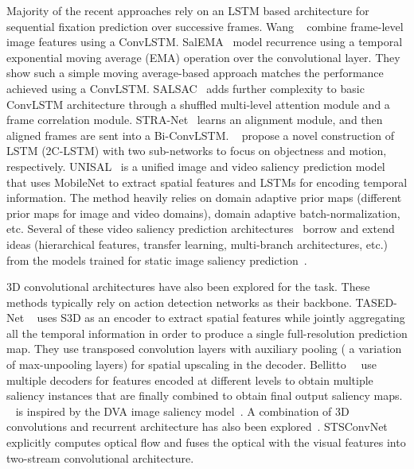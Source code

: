 \documentclass[letterpaper, 10 pt, conference]{ieeeconf}  \usepackage{times}
\begin{document}
Majority of the recent approaches rely on an LSTM based architecture for sequential fixation prediction over successive frames. Wang \etal~\cite{wang2018revisiting} combine frame-level image features using a ConvLSTM. SalEMA~\cite{linardos2019simple} model recurrence using a temporal exponential moving average (EMA) operation over the convolutional layer. They show such a simple moving average-based approach matches the performance achieved using a ConvLSTM. SALSAC~\cite{wu2020salsac} adds further complexity to basic ConvLSTM architecture through a shuffled multi-level attention module and a frame correlation module. STRA-Net~\cite{chen2020video} learns an alignment module, and then aligned frames are sent into a Bi-ConvLSTM. ~\cite{jiang2017predicting} propose a novel construction of LSTM (2C-LSTM) with two sub-networks to focus on objectness and motion, respectively. UNISAL~\cite{droste2020unified} is a unified image and video saliency prediction model that uses MobileNet to extract spatial features and LSTMs for encoding temporal information. The method heavily relies on domain adaptive prior maps (different prior maps for image and video domains), domain adaptive batch-normalization, etc. Several of these video saliency prediction architectures~\cite{droste2020unified,wang2018revisiting} borrow and extend ideas (hierarchical features, transfer learning, multi-branch architectures, etc.) from the models trained for static image saliency prediction~\cite{jiang2015salicon,reddy2020tidying}.  

3D convolutional architectures have also been explored for the task. These methods typically rely on action detection networks as their backbone. TASED-Net ~\cite{min2019tased} uses S3D as an encoder to extract spatial features while jointly aggregating all the temporal information in order to produce a single full-resolution prediction map. They use transposed convolution layers with auxiliary pooling ( a variation of max-unpooling layers) for spatial upscaling in the decoder. Bellitto~\etal~\cite{bellitto2020video} use multiple decoders for features encoded at different levels to obtain multiple saliency instances that are finally combined to obtain final output saliency maps. ~\cite{bellitto2020video} is inspired by the DVA image saliency model~\cite{wang2017deep}. A combination of 3D convolutions and recurrent architecture has also been explored~\cite{bazzani2016recurrent}. STSConvNet~\cite{bak2017spatio} explicitly computes optical flow and fuses the optical with the visual features into two-stream convolutional architecture. 
\end{document}
